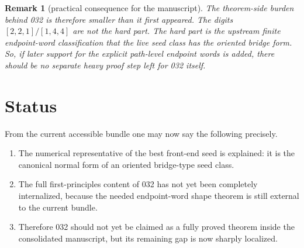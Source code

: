 \documentclass[11pt]{article}
\newtheorem{remark}[theorem]{Remark}
\begin{document}
\begin{remark}[practical consequence for the manuscript]
The theorem-side burden behind \textup{032} is therefore smaller than it first
appeared.
The digits $[2,2,1]/[1,4,4]$ are not the hard part.
The hard part is the upstream finite endpoint-word classification that the live
seed class has the oriented bridge form.
So, if later support for the explicit path-level endpoint words is added, there
should be no separate heavy proof step left for \textup{032} itself.
\end{remark}

\section{Status}

From the current accessible bundle one may now say the following precisely.

\begin{enumerate}[label=\textup{(\arabic*)},leftmargin=2.5em]
\item The numerical representative of the best front-end seed is explained:
      it is the canonical normal form of an oriented bridge-type seed class.
\item The full first-principles content of \textup{032} has not yet been
      completely internalized, because the needed endpoint-word shape theorem
      is still external to the current bundle.
\item Therefore \textup{032} should not yet be claimed as a fully proved
      theorem inside the consolidated manuscript, but its remaining gap is now
      sharply localized.
\end{enumerate}
\end{document}
